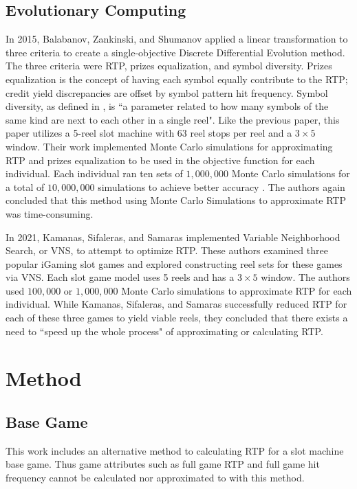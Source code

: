 \documentclass[conference]{IEEEtran}
\begin{document}
\subsection{Evolutionary Computing}
In 2015, Balabanov, Zankinski, and Shumanov applied a linear transformation to three criteria to create a single-objective Discrete Differential Evolution method\cite{balabanovDDE}.
The three criteria were RTP, prizes equalization, and symbol diversity.
Prizes equalization is the concept of having each symbol equally contribute to the RTP; credit yield discrepancies are offset by symbol pattern hit frequency.
Symbol diversity, as defined in \cite{balabanovDDE}, is ``a parameter related to how many symbols of the same kind are next to each other in a single reel".
Like the previous paper, this paper utilizes a 5-reel slot machine with 63 reel stops per reel and a $3\times 5$ window.
Their work implemented Monte Carlo simulations for approximating RTP and prizes equalization to be used in the objective function for each individual.
Each individual ran ten sets of $1,000,000$ Monte Carlo simulations for a total of $10,000,000$ simulations to achieve better accuracy \cite{balabanovDDE}.
The authors again concluded that this method using Monte Carlo Simulations to approximate RTP was time-consuming.
\par
In 2021, Kamanas, Sifaleras, and Samaras implemented Variable Neighborhood Search, or VNS, to attempt to optimize RTP\cite{kamanas2021slot}.
These authors examined three popular iGaming slot games and explored constructing reel sets for these games via VNS.
Each slot game model uses 5 reels and has a $3\times 5$ window.
The authors used $100,000$ or $1,000,000$ Monte Carlo simulations to approximate RTP for each individual.
While Kamanas, Sifaleras, and Samaras successfully reduced RTP for each of these three games to yield viable reels, they concluded that there exists a need to ``speed up the whole process" of approximating or calculating RTP\cite{kamanas2021slot}.

\section{Method}
\label{method}
\subsection{Base Game}
This work includes an alternative method to calculating RTP for a slot machine base game. Thus game attributes such as full game RTP and full game hit frequency cannot be calculated nor approximated to with this method.
\end{document}
